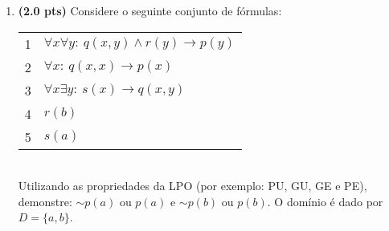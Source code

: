 \documentclass[11pt, a4paper,final]{article}
\begin{document}
\begin{enumerate}
\begin{comment}
 
\item  $\{ p \vee q \: ,
  \:\: q \rightarrow r \: ,
    \:\: p \rightarrow s \: ,
     \:\: \sim s   \} \vdash r \wedge (p \vee q) $
\end{enumerate}


\item {\bf (1.0 pt)} Utilizando o método de  {\em demonstração por condicional}  a validade do   argumento $ p \rightarrow u $, a partir das premissas:
$$ \{ p \vee q \rightarrow r,~ s \rightarrow \sim r \wedge \sim t,~ s \vee u \} ~\vdash~ p \rightarrow u $$
\end{comment}  


\item {\bf (2.0 pts)} Considere o seguinte conjunto de fórmulas: 

\begin{tabular}{ll}
1 &  $\forall x\forall y:~ q(x,y) \wedge r(y) \rightarrow p(y) $ \\
2 &  $\forall x:~  q(x,x) \rightarrow p(x)  $ \\
3 &  $\forall x\exists y:~  s(x) \rightarrow q(x,y) $ \\
4 &  $r(b)$ \\ 
5 &  $s(a)$ \\
\end{tabular}\\
Utilizando as propriedades da LPO (por exemplo: PU, GU, GE e PE), 
demonstre: $\sim p(a)$ ou $p(a)$ e $\sim p(b)$ ou $p(b)$.
O domínio é dado por $D=\{a,b\}$. 

\begin{comment}

\item {\bf (1.5 pts)} Considere a seguinte interpretação em um domínio dado por $D=\{a,b\}$. 

\begin{tabular}{c |c | c | c } \hline \hline 
p(a,a) & p(a,b)  & p(b,a) & p(b,b)  \\  \hline 
 V & F & F & V \\ \hline \hline 
\end{tabular}

Determine o valor verdade ($f_{aval}$  ou $\Phi $), passo-a-passo, das seguintes fórmulas:


\end{comment}
\end{enumerate}
\end{document}
